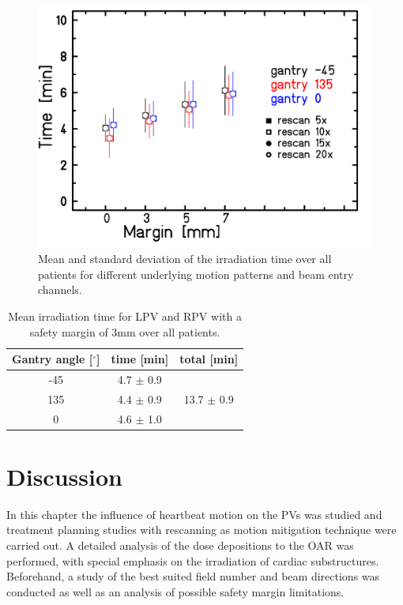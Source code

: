  \begin{figure}[H]
 \begin{center}
 \includegraphics[scale=0.2]{./teile/results_human/All_irrTime.png}
\caption{Mean and standard deviation of the irradiation time over all patients for different underlying motion patterns and beam entry 
channels.}
\label{irrTime_all}
 \end{center}
\end{figure}

\begin{table}[H]
  \centering
  \caption{Mean irradiation time for LPV and RPV with a safety margin of 3mm over all patients.}
  \begin{tabular}{|c|c|c|}
    \hline\hline
    Gantry angle [$^{\circ}$] & time [min] & total [min] \\
    \hline
    -45 & 4.7 $\pm$ 0.9 & \\
    135 &  4.4 $\pm$ 0.9 & 13.7 $\pm$ 0.9\\
    0 & 4.6  $\pm$ 1.0 & \\
    \hline\hline
    \end{tabular}
  \label{tab:rescan_time}
\end{table}


\newpage

\section{Discussion}

In this chapter the influence of heartbeat motion on the PVs was studied and treatment planning studies with rescanning as motion 
mitigation technique were carried out. A detailed analysis of the dose depositions to the OAR was performed, with special 
emphasis on the irradiation of cardiac substructures. Beforehand, a study of the best suited field number and beam directions was  
conducted as well as an analysis of possible safety margin limitations. 


